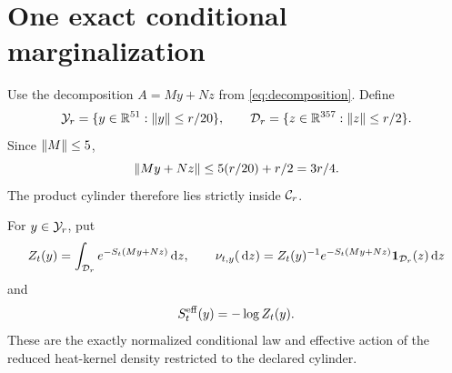 \section{One exact conditional marginalization}\label{sec:marginal}

Use the decomposition $A=My+Nz$ from \eqref{eq:decomposition}.  Define
\begin{equation}\label{eq:cylinder}
 \mathcal Y_r=\{y\in\mathbb R^{51}:\lVert y\rVert\le r/20\},\qquad
 \mathcal D_r=\{z\in\mathbb R^{357}:\lVert z\rVert\le r/2\}.
\end{equation}
Since $\lVert M\rVert\le5$,
\[
 \lVert My+Nz\rVert\le5(r/20)+r/2=3r/4.
\]
The product cylinder therefore lies strictly inside $\mathcal C_r$.

For $y\in\mathcal Y_r$, put
\begin{equation}\label{eq:conditional-law}
 Z_t(y)=\int_{\mathcal D_r}e^{-S_t(My+Nz)}\,\mathrm d z,\qquad
 \nu_{t,y}(\,\mathrm d z)=Z_t(y)^{-1}e^{-S_t(My+Nz)}\mathbf1_{\mathcal D_r}(z)\,\mathrm d z
\end{equation}
and
\begin{equation}\label{eq:effective-action}
 S_t^{\mathrm{eff}}(y)=-\log Z_t(y).
\end{equation}
These are the exactly normalized conditional law and effective action of the
reduced heat-kernel density restricted to the declared cylinder.

